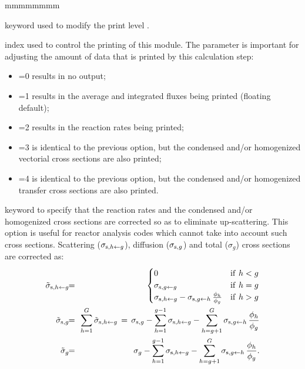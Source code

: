 \begin{ListeDeDescription}{mmmmmmmm}

\item[\moc{EDIT}] keyword used to modify the print level .

\item[\dusa{iprint}] index used to control the printing of this module. The
 parameter is important for adjusting the amount of data that is
printed by this calculation step:

\begin{itemize}

\item {}=0 results in no output;

\item {}=1 results in the average and integrated fluxes being printed
(floating default);

\item {}=2 results in the reaction rates being printed; 

\item {}=3 is identical to the previous option, but the condensed
and/or homogenized vectorial cross sections are also printed;

\item {}=4 is identical to the previous option, but the  condensed
and/or homogenized transfer cross sections are also printed.

\end{itemize}

\item[\moc{UPS}] keyword to specify that the reaction rates and the condensed
and/or homogenized cross sections are corrected so as to eliminate
up-scattering. This option is useful for reactor analysis codes which cannot
take into account such cross sections. Scattering ($\sigma_{{\rm s},h\gets g}$), diffusion ($\sigma_{{\rm s},g}$)
and total ($\sigma_g$) cross sections are corrected as:
\begin{eqnarray*}
\tilde\sigma_{{\rm s},h\gets g}\negthinspace\negthinspace &=&\negthinspace\negthinspace \begin{cases} 0  & {\rm if} \ h < g\\
\sigma_{{\rm s},g\gets g} &{\rm if}  \ h = g\\
\sigma_{{\rm s},h\gets g}-\sigma_{{\rm s},g\gets h}\, {\phi_h\over \phi_g} & {\rm if}  \ h > g
\end{cases} \\
\tilde\sigma_{{\rm s},g}\negthinspace\negthinspace &=&\negthinspace\negthinspace \sum_{h=1}^G \tilde\sigma_{{\rm s},h\gets g}\, = \, \sigma_{{\rm s},g}-\sum_{h=1}^{g-1} \sigma_{{\rm s},h\gets g}-\sum_{h=g+1}^{G} \sigma_{{\rm s},g\gets h}\, {\phi_h\over \phi_g} \\
\tilde\sigma_{g}\negthinspace\negthinspace &=&\negthinspace\negthinspace \sigma_{g}-\sum_{h=1}^{g-1} \sigma_{{\rm s},h\gets g}-\sum_{h=g+1}^{G} \sigma_{{\rm s},g\gets h}\, {\phi_h\over \phi_g} .
\end{eqnarray*}


\end{ListeDeDescription}
